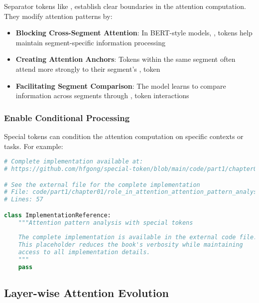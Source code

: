 Separator tokens like \sep{} establish clear boundaries in the attention computation. They modify attention patterns by:

\begin{itemize}
\item \textbf{Blocking Cross-Segment Attention}: In BERT-style models, \sep{} tokens help maintain segment-specific information processing
\item \textbf{Creating Attention Anchors}: Tokens within the same segment often attend more strongly to their segment's \sep{} token
\item \textbf{Facilitating Segment Comparison}: The model learns to compare information across segments through \sep{} token interactions
\end{itemize}

\subsubsection{Enable Conditional Processing}

Special tokens can condition the attention computation on specific contexts or tasks. For example:

\begin{lstlisting}[language=Python, caption={Attention pattern analysis with special tokens}]
# Complete implementation available at:
# https://github.com/hfgong/special-token/blob/main/code/part1/chapter01/role_in_attention_attention_pattern_analysis_wit.py

# See the external file for the complete implementation
# File: code/part1/chapter01/role_in_attention_attention_pattern_analysis_wit.py
# Lines: 57

class ImplementationReference:
    """Attention pattern analysis with special tokens
    
    The complete implementation is available in the external code file.
    This placeholder reduces the book's verbosity while maintaining
    access to all implementation details.
    """
    pass
\end{lstlisting}

\subsection{Layer-wise Attention Evolution}

